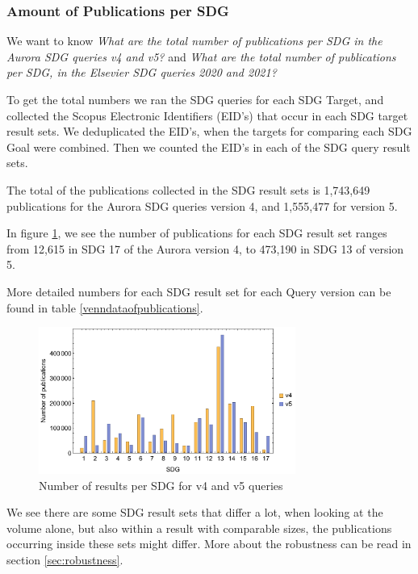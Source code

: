 \documentclass{article}
\begin{document}

\subsubsection{Amount of Publications per SDG}
We want to know \emph{What are the total number of publications per SDG in the Aurora SDG queries v4 and v5?} and \emph{What are the total number of  publications per SDG, in the Elsevier SDG queries 2020 and 2021?}

To get the total numbers we ran the  SDG queries for each SDG Target, and collected the Scopus Electronic Identifiers (EID's) that occur in each SDG target result sets. We deduplicated the EID's, when the targets for comparing each SDG Goal were combined. Then we counted the EID's in each of the SDG query result sets.

The total of the publications collected in the SDG result sets is 1,743,649 publications for the Aurora SDG queries version 4, and 1,555,477 for version 5.

In figure \ref{numberofresults}, we see the number of publications for each SDG result set ranges from 12,615 in SDG 17 of the Aurora version 4, to 473,190 in SDG 13 of version 5.

More detailed numbers for each SDG result set for each Query version can be found in table \ref{venndataofpublications}.

\begin{figure}[ht]
	\centering
  \includegraphics[width=0.75\textwidth]{figures/numberofresultsv4vsv5.pdf}
	\caption{Number of results per SDG for v4 and v5 queries}
	\label{numberofresults}
\end{figure}

We see there are some SDG result sets that differ a lot, when looking at the volume alone, but also within a result with comparable sizes, the publications occurring inside these sets might differ. More about the robustness can be read in section \ref{sec:robustness}.
\end{document}
